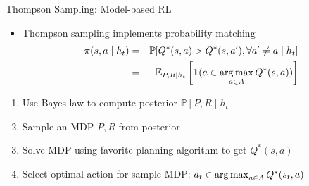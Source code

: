 \begin{frame}[c]{Thompson Sampling: Model-based RL}
	
	\begin{itemize}
		\item Thompson sampling implements probability matching
	\begin{eqnarray}
	\pi(s, a \mid h_t) &=& \mathbb{P} [Q^*(s,a) > Q^*(s,a'), \forall a' \neq a \mid h_t]\nonumber \\
	&=& \mathbb{E}_{P, R \mid h_t} \left[\mathbf{1}(a \in \operatorname*{arg\,max}_{a \in A} Q^*(s,a))\right]		\nonumber
	\end{eqnarray}
	\end{itemize}
	
	\begin{enumerate}		
		\item Use Bayes law to compute posterior $ \mathbb{P}[P, R \mid h_t]$
		\item Sample an MDP $P, R$ from posterior
		\item Solve MDP using favorite planning algorithm to get $Q^*(s,a)$
		\item Select optimal action for sample MDP: $a_t \in \operatorname*{arg\,max}_{a \in A}Q^*(s_t,a)$
	\end{enumerate}
	
\end{frame}


